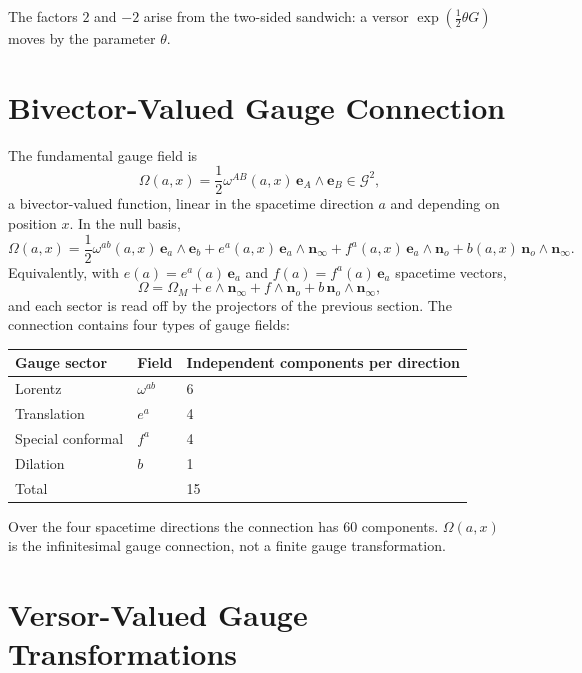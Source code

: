 \documentclass[11pt,a4paper]{article}
\newcommand{\G}{\mathcal{G}}
\newcommand{\Om}{\Omega}
\newcommand{\nzero}{\mathbf{n}_o}
\newcommand{\ninf}{\mathbf{n}_\infty}
\newcommand{\e}{\mathbf{e}}
\newcommand{\wedgeprod}{\mathbin{\wedge}}
\begin{document}
The factors \(2\) and \(-2\) arise from the two-sided sandwich: a
versor \(\exp(\tfrac12\theta G)\) moves by the parameter \(\theta\).

\section{Bivector-Valued Gauge Connection}

The fundamental gauge field is
\[
    \boxed{
        \Om(a,x)
        =
        \frac{1}{2}
        \omega^{AB}(a,x)\,
        \e_A\wedgeprod\e_B
        \in\G^2,
    }
\]
a bivector-valued function, linear in the spacetime direction \(a\)
and depending on position \(x\). In the null basis,
\[
\boxed{
    \Om(a,x)
    =
    \frac{1}{2}\omega^{ab}(a,x)\,\e_a\wedgeprod\e_b
    +e^a(a,x)\,\e_a\wedgeprod\ninf
    +f^a(a,x)\,\e_a\wedgeprod\nzero
    +b(a,x)\,\nzero\wedgeprod\ninf .
}
\]
Equivalently, with \(e(a)=e^a(a)\,\e_a\) and \(f(a)=f^a(a)\,\e_a\)
spacetime vectors,
\[
    \Om=\Om_M+e\wedgeprod\ninf+f\wedgeprod\nzero
       +b\,\nzero\wedgeprod\ninf ,
\]
and each sector is read off by the projectors of the previous
section. The connection contains four types of gauge fields:

\begin{center}
\begin{tabular}{lll}
    \toprule
    Gauge sector & Field & Independent components per direction\\
    \midrule
    Lorentz & \(\omega^{ab}\) & 6\\
    Translation & \(e^a\) & 4\\
    Special conformal & \(f^a\) & 4\\
    Dilation & \(b\) & 1\\
    \midrule
    Total & & 15\\
    \bottomrule
\end{tabular}
\end{center}

Over the four spacetime directions the connection has \(60\)
components. \(\Om(a,x)\) is the infinitesimal gauge connection, not a
finite gauge transformation.

\section{Versor-Valued Gauge Transformations}
\end{document}
